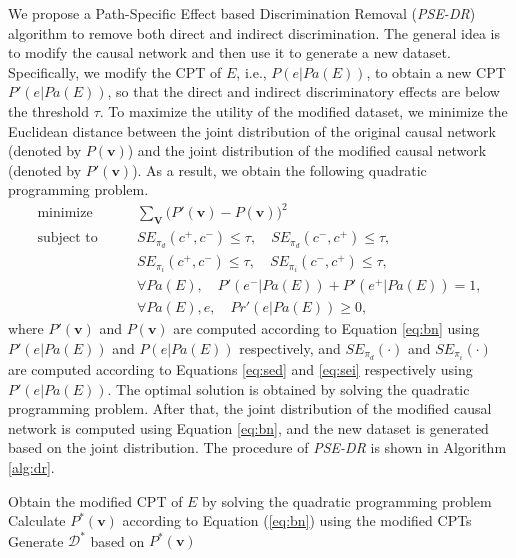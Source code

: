 \documentclass[letterpaper]{article}
\begin{document}
We propose a Path-Specific Effect based Discrimination Removal (\emph{PSE-DR}) algorithm to remove both direct and indirect discrimination. The general idea is to modify the causal network and then use it to generate a new dataset. Specifically, we modify the CPT of $E$, i.e., $P(e|Pa(E))$, to obtain a new CPT $P'(e|Pa(E))$, so that the direct and indirect discriminatory effects are below the threshold $\tau$. To maximize the utility of the modified dataset, we minimize the Euclidean distance between the joint distribution of the original causal network (denoted by $P(\mathbf{v})$) and the joint distribution of the modified causal network (denoted by $P'(\mathbf{v})$). As a result, we obtain the following quadratic programming problem.
\begin{equation*}
\begin{split}
\textrm{minimize} & \qquad \sum_{\mathbf{V}}\Big(  P'(\mathbf{v})-P(\mathbf{v}) \Big)^{2} \\
\textrm{subject to} & \qquad SE_{\pi_{d}}(c^{+},c^{-})\leq \tau, \quad SE_{\pi_{d}}(c^{-},c^{+})\leq \tau, \\
& \qquad SE_{\pi_{i}}(c^{+},c^{-})\leq \tau, \quad SE_{\pi_{i}}(c^{-},c^{+})\leq \tau, \\
& \qquad \forall Pa(E),\quad P'(e^{-}|Pa(E))+P'(e^{+}|Pa(E)) = 1, \\
& \qquad \forall Pa(E),e,\quad Pr'(e|Pa(E)) \geq 0,
\end{split}
\end{equation*}
where $P'(\mathbf{v})$ and $P(\mathbf{v})$ are computed according to Equation \eqref{eq:bn} using $P'(e|Pa(E))$ and $P(e|Pa(E))$ respectively, and $SE_{\pi_{d}}(\cdot)$ and $SE_{\pi_{i}}(\cdot)$ are computed according to Equations \eqref{eq:sed} and \eqref{eq:sei} respectively using $P'(e|Pa(E))$. The optimal solution is obtained by solving the quadratic programming problem. After that, the joint distribution of the modified causal network is computed using Equation \eqref{eq:bn}, and the new dataset is generated based on the joint distribution. The procedure of \emph{PSE-DR} is shown in Algorithm \ref{alg:dr}. 

\begin{algorithm}
\SetAlgoVlined
\small
		
		Obtain the modified CPT of $E$ by solving the quadratic programming problem\;
		Calculate $P^{*}(\mathbf{v})$ according to Equation (\ref{eq:bn}) using the modified CPTs\;
		Generate $\mathcal{D}^{*}$ based on $P^{*}(\mathbf{v})$\;		
		\;
		\caption{\emph{PSE-DR}}
		\label{alg:dr}
\end{algorithm}
\end{document}
